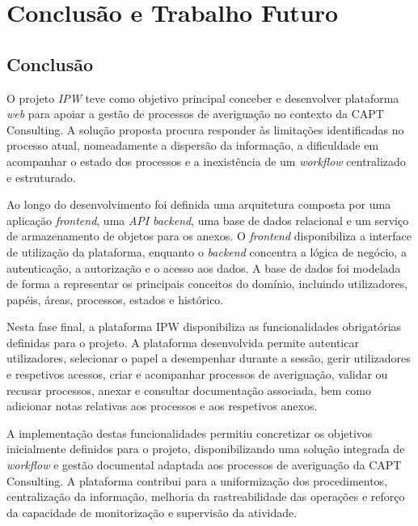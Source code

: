 \chapter{Conclus\~{a}o e Trabalho Futuro} \label{cap:conclusao}

\section{Conclus\~{a}o} \label{sec:conclusao}

O projeto \textit{IPW} teve como objetivo principal conceber e desenvolver plataforma \textit{web} para apoiar a gest\~{a}o de processos de averigua\c{c}\~{a}o no contexto da CAPT Consulting. A solu\c{c}\~{a}o proposta procura responder \`{a}s limita\c{c}\~{o}es identificadas no processo atual, nomeadamente a dispers\~{a}o da informa\c{c}\~{a}o, a dificuldade em acompanhar o estado dos processos e a inexist\^{e}ncia de um \textit{workflow} centralizado e estruturado.

Ao longo do desenvolvimento foi definida uma arquitetura composta por uma aplica\c{c}\~{a}o \textit{frontend}, uma \textit{API} \textit{backend}, uma base de dados relacional e um servi\c{c}o de armazenamento de objetos para os anexos. O \textit{frontend} disponibiliza a interface de utiliza\c{c}\~{a}o da plataforma, enquanto o \textit{backend} concentra a l\'{o}gica de neg\'{o}cio, a autentica\c{c}\~{a}o, a autoriza\c{c}\~{a}o e o acesso aos dados. A base de dados foi modelada de forma a representar os principais conceitos do dom\'{i}nio, incluindo utilizadores, pap\'{e}is, \'{a}reas, processos, estados e hist\'{o}rico.


Nesta fase final, a plataforma IPW disponibiliza as funcionalidades obrigatórias definidas para o projeto. A plataforma desenvolvida permite autenticar utilizadores, selecionar o papel a desempenhar durante a sessão, gerir utilizadores e respetivos acessos, criar e acompanhar processos de averiguação, validar ou recusar processos, anexar e consultar documentação associada, bem como adicionar notas relativas aos processos e aos respetivos anexos.

A implementação destas funcionalidades permitiu concretizar os objetivos inicialmente definidos para o projeto, disponibilizando uma solução integrada de \textit{workflow} e gestão documental adaptada aos processos de averiguação da CAPT Consulting. A plataforma contribui para a uniformização dos procedimentos, centralização da informação, melhoria da rastreabilidade das operações e reforço da capacidade de monitorização e supervisão da atividade.

